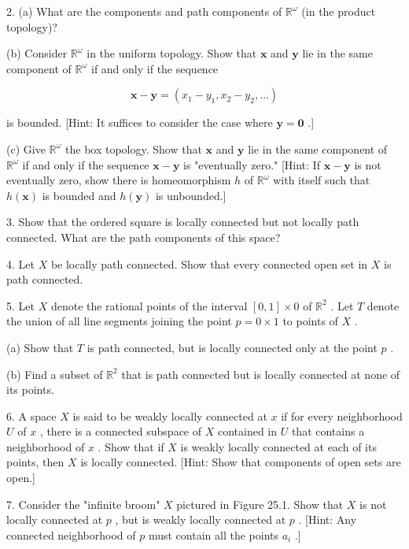 2. (a) What are the components and path components of \({\mathbb{R}}^{\omega }\) (in the product topology)?

(b) Consider \({\mathbb{R}}^{\omega }\) in the uniform topology. Show that \(\mathbf{x}\) and \(\mathbf{y}\) lie in the same component of \({\mathbb{R}}^{\omega }\) if and only if the sequence

\[
\mathbf{x} - \mathbf{y} = \left( {{x}_{1} - {y}_{1},{x}_{2} - {y}_{2},\ldots }\right)
\]

is bounded. [Hint: It suffices to consider the case where \(\mathbf{y} = \mathbf{0}\) .]

(c) Give \({\mathbb{R}}^{\omega }\) the box topology. Show that \(\mathbf{x}\) and \(\mathbf{y}\) lie in the same component of \({\mathbb{R}}^{\omega }\) if and only if the sequence \(\mathbf{x} - \mathbf{y}\) is "eventually zero." [Hint: If \(\mathbf{x} - \mathbf{y}\) is not eventually zero, show there is homeomorphism \(h\) of \({\mathbb{R}}^{\omega }\) with itself such that \(h\left( \mathbf{x}\right)\) is bounded and \(h\left( \mathbf{y}\right)\) is unbounded.]

3. Show that the ordered square is locally connected but not locally path connected. What are the path components of this space?

4. Let \(X\) be locally path connected. Show that every connected open set in \(X\) is path connected.

5. Let \(X\) denote the rational points of the interval \(\left\lbrack  {0,1}\right\rbrack   \times  0\) of \({\mathbb{R}}^{2}\) . Let \(T\) denote the union of all line segments joining the point \(p = 0 \times  1\) to points of \(X\) .

(a) Show that \(T\) is path connected, but is locally connected only at the point \(p\) .

(b) Find a subset of \({\mathbb{R}}^{2}\) that is path connected but is locally connected at none of its points.

6. A space \(X\) is said to be weakly locally connected at \(x\) if for every neighborhood \(U\) of \(x\) , there is a connected subspace of \(X\) contained in \(U\) that contains a neighborhood of \(x\) . Show that if \(X\) is weakly locally connected at each of its points, then \(X\) is locally connected. [Hint: Show that components of open sets are open.]

7. Consider the "infinite broom" \(X\) pictured in Figure 25.1. Show that \(X\) is not locally connected at \(p\) , but is weakly locally connected at \(p\) . [Hint: Any connected neighborhood of \(p\) must contain all the points \({a}_{i}\) .]

